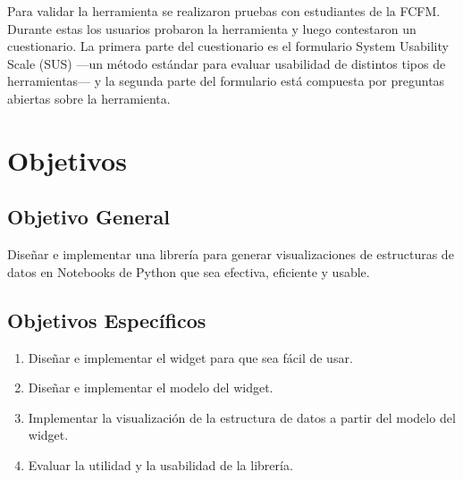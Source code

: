 Para validar la herramienta se realizaron pruebas con estudiantes de la FCFM. Durante estas los usuarios probaron la herramienta y luego contestaron un cuestionario. La primera parte del cuestionario es el formulario System Usability Scale (SUS) ---un método estándar para evaluar usabilidad de distintos tipos de herramientas--- y la segunda parte del formulario está compuesta por preguntas abiertas sobre la herramienta.

\section{Objetivos}

\subsection*{Objetivo General}\label{sec:obj-g}

Diseñar e implementar una librería para generar visualizaciones de estructuras de datos en Notebooks de Python que sea efectiva, eficiente y usable.

\subsection*{Objetivos Específicos}\label{sec:obj-e}

\begin{enumerate}
  \item Diseñar e implementar el widget para que sea fácil de usar.
  \item Diseñar e implementar el modelo del widget.
  \item Implementar la visualización de la estructura de datos a partir del modelo del widget.
  \item Evaluar la utilidad y la usabilidad de la librería.
\end{enumerate}
